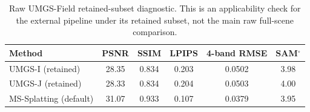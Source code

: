 \begin{table}[H]
    \caption{Raw UMGS-Field retained-subset diagnostic. This is an applicability check for the external pipeline under its retained subset, not the main raw full-scene comparison.}
    \label{tab:retained-self}
    \centering
    \scriptsize
    \begin{tabular}{lccccc}
        \toprule
        Method & PSNR & SSIM & LPIPS & 4-band RMSE & SAM$^\circ$ \\
        \midrule
        UMGS-I (retained) & 28.35 & 0.834 & 0.203 & 0.0502 & 3.98 \\
        UMGS-J (retained) & 28.33 & 0.834 & 0.204 & 0.0503 & 4.00 \\
        MS-Splatting (default) & 31.07 & 0.933 & 0.107 & 0.0379 & 3.95 \\
        \bottomrule
    \end{tabular}
\end{table}

